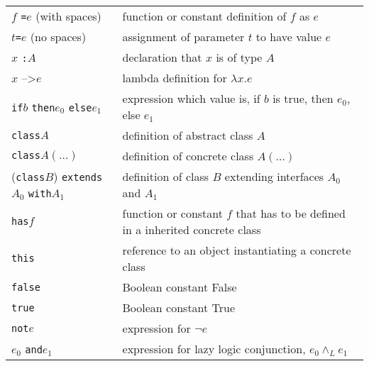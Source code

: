 \documentclass[12pt,a4paper]{book}
\newcommand{\srccode}[1]{\texttt{{#1}}}
\newcommand{\reservedWord}[1]{{\color{blue}\srccode{#1}}\xspace}
\newcommand{\sdef}{\srccode{=}\xspace}
\newcommand{\scolon}{\srccode{:}}
\newcommand{\slambda}{{\tiny--\textgreater}\xspace}
\newcommand{\sif}{\reservedWord{if}}
\newcommand{\sthen}{\reservedWord{then}}
\newcommand{\selse}{\reservedWord{else}}
\newcommand{\sclass}{\reservedWord{class}}
\newcommand{\shas}{\reservedWord{has}}
\newcommand{\sextends}{\reservedWord{extends}}
\newcommand{\swith}{\reservedWord{with}}
\newcommand{\sthis}{\reservedWord{this}}
\newcommand{\sfalse}{\reservedWord{false}}
\newcommand{\strue}{\reservedWord{true}}
\newcommand{\snot}{\reservedWord{not}}
\newcommand{\sand}{\reservedWord{and}}
\begin{document}
    \begin{tabular}{ll}
        \hline
        $f$ \sdef $e$ (with spaces)                    & function or constant definition of $f$ as $e$                                 \\
        $t$\srccode{=}$e$ (no spaces)                  & assignment of parameter $t$ to have value $e$                                 \\
        $x$ \scolon $A$                                & declaration that $x$ is of type $A$                                           \\
        $x$ \slambda $e$                               & lambda definition for $\lambda x . e$                                         \\
        \hline
        \sif $b$ \sthen $e_{0}$ \selse $e_{1}$         & expression which value is, if $b$ is true, then $e_{0}$, else $e_{1}$         \\
        \hline
        \sclass $A$                                    & definition of abstract class $A$                                              \\
        \sclass $A(\ldots)$                            & definition of concrete class $A(\ldots )$                                                                       \\
        (\sclass $B$) \sextends $A_{0}$ \swith $A_{1}$ & definition of class $B$ extending interfaces $A_{0}$ and $A_{1}$              \\
        \shas $f$                                      & function or constant $f$ that has to be defined in a inherited concrete class \\
        \sthis                                         & reference to an object instantiating a concrete class                         \\
        \hline
        \sfalse                                        & Boolean constant False                                                        \\
        \strue                                         & Boolean constant True                                                         \\
        \snot $e$                                      & expression for $\lnot e$                                                      \\
        $e_{0}$ \sand $e_{1}$                          & expression for lazy logic conjunction, $e_{0} \land _{L} e_{1}$               \\

\end{tabular}
\end{document}
